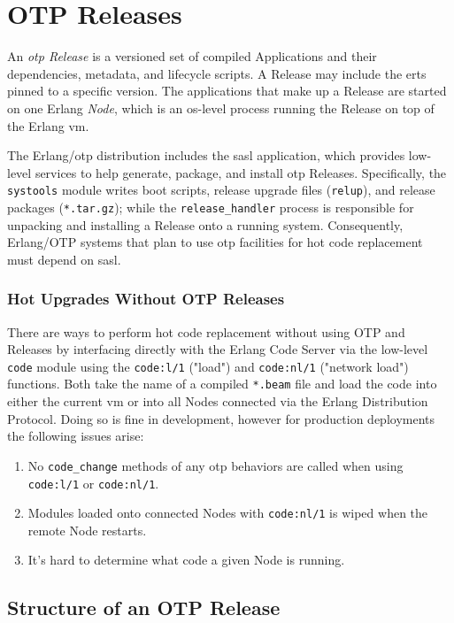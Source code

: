 \section{OTP Releases}
An \emph{\acrshort{otp} Release} is a versioned set of compiled Applications and their dependencies, metadata, and lifecycle scripts. A Release may include the \acrfull{erts} pinned to a specific version. The applications that make up a Release are started on one Erlang \emph{Node}, which is an \acrshort{os}-level process running the Release on top of the Erlang \acrshort{vm}.

The Erlang/\acrshort{otp} distribution includes the \acrfull{sasl} application, which provides low-level services to help generate, package, and install \acrshort{otp} Releases. Specifically, the \lstinline|systools| module writes boot scripts, release upgrade files (\lstinline|relup|), and release packages (\lstinline|*.tar.gz|); while the \lstinline|release_handler| process is responsible for unpacking and installing a Release onto a running system. Consequently, Erlang/OTP systems that plan to use \acrshort{otp} facilities for hot code replacement must depend on \acrshort{sasl}.

\subsubsection{Hot Upgrades Without OTP Releases}

There are ways to perform hot code replacement without using OTP and Releases by interfacing directly with the Erlang Code Server via the low-level \lstinline|code| module using the \lstinline|code:l/1| ("load") and \lstinline|code:nl/1| ("network load") functions. Both take the name of a compiled \lstinline|*.beam| file and load the code into either the current \acrshort{vm} or into all Nodes connected via the Erlang Distribution Protocol. Doing so is fine in development, however for production deployments the following issues arise:

\begin{enumerate}
\item No \lstinline|code_change| methods of any \acrshort{otp} behaviors are called when using \lstinline|code:l/1| or \lstinline|code:nl/1|.
\item Modules loaded onto connected Nodes with \lstinline|code:nl/1| is wiped when the remote Node restarts.
\item It's hard to determine what code a given Node is running.
\end{enumerate}


\subsection{Structure of an OTP Release}


